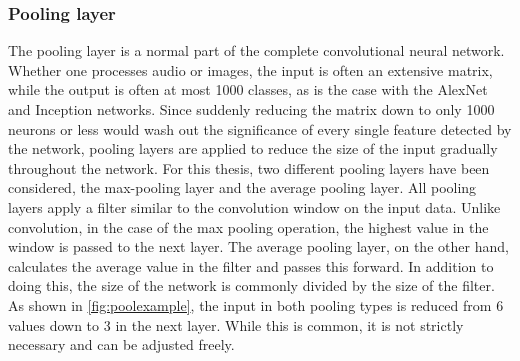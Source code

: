 \subsubsection{Pooling layer}
The pooling layer is a normal part of the complete convolutional neural network.
Whether one processes audio or images, the input is often an extensive matrix, while the output is often at most 1000 classes, as is the case with the AlexNet\cite{Krizhevsky:2017:ICD:3098997.3065386} and Inception\cite{szegedy2014going} networks.
Since suddenly reducing the matrix down to only 1000 neurons or less would wash out the significance of every single feature detected by the network, pooling layers are applied to reduce the size of the input gradually throughout the network.
For this thesis, two different pooling layers have been considered, the max-pooling layer and the average pooling layer.
All pooling layers apply a filter similar to the convolution window on the input data.
Unlike convolution, in the case of the max pooling operation, the highest value in the window is passed to the next layer.
The average pooling layer, on the other hand, calculates the average value in the filter and passes this forward.
In addition to doing this, the size of the network is commonly divided by the size of the filter.
As shown in \cref{fig:poolexample}, the input in both pooling types is reduced from 6 values down to 3 in the next layer.
While this is common, it is not strictly necessary and can be adjusted freely.


